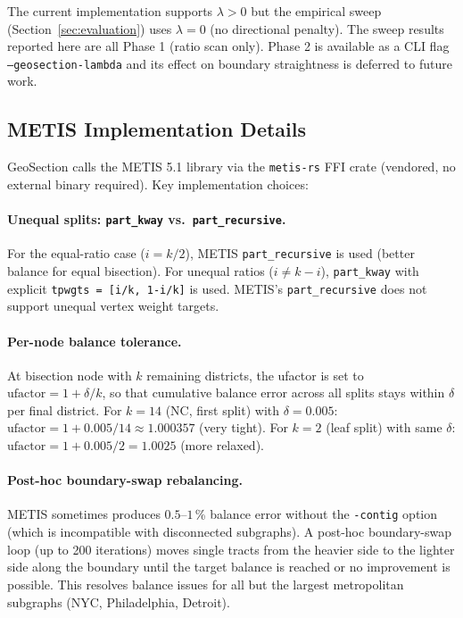 \begin{remark}
The current implementation supports $\lambda > 0$ but the empirical sweep
(Section~\ref{sec:evaluation}) uses $\lambda = 0$ (no directional penalty).
The sweep results reported here are all Phase 1 (ratio scan only).
Phase 2 is available as a CLI flag \texttt{--geosection-lambda} and its
effect on boundary straightness is deferred to future work.
\end{remark}

\subsection{METIS Implementation Details}

GeoSection calls the METIS 5.1 library via the \texttt{metis-rs} FFI crate
(vendored, no external binary required).
Key implementation choices:

\paragraph{Unequal splits: \texttt{part\_kway} vs.\ \texttt{part\_recursive}.}
For the equal-ratio case ($i = k/2$), METIS \texttt{part\_recursive} is used
(better balance for equal bisection).
For unequal ratios ($i \neq k - i$), \texttt{part\_kway} with explicit
\texttt{tpwgts = [i/k, 1-i/k]} is used.
METIS's \texttt{part\_recursive} does not support unequal vertex weight targets.

\paragraph{Per-node balance tolerance.}
At bisection node with $k$ remaining districts, the ufactor is set to
$\mathrm{ufactor} = 1 + \delta / k$, so that cumulative balance error
across all splits stays within $\delta$ per final district.
For $k=14$ (NC, first split) with $\delta=0.005$:
$\mathrm{ufactor} = 1 + 0.005/14 \approx 1.000357$ (very tight).
For $k=2$ (leaf split) with same $\delta$:
$\mathrm{ufactor} = 1 + 0.005/2 = 1.0025$ (more relaxed).

\paragraph{Post-hoc boundary-swap rebalancing.}
METIS sometimes produces $0.5$--$1$\,\% balance error without the
\texttt{-contig} option (which is incompatible with disconnected subgraphs).
A post-hoc boundary-swap loop (up to 200 iterations) moves single tracts
from the heavier side to the lighter side along the boundary until the
target balance is reached or no improvement is possible.
This resolves balance issues for all but the largest metropolitan subgraphs
(NYC, Philadelphia, Detroit).

